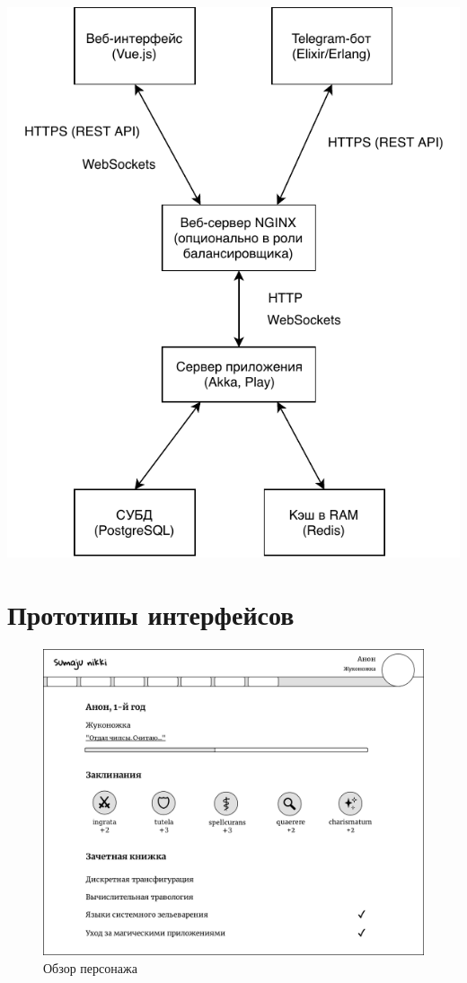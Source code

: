 \documentclass[12pt, a4paper]{article}
\begin{document}
\begin{center}
\includegraphics{architecture-overview.pdf}
\end{center}

\section{Прототипы интерфейсов}

\begin{figure}[H]
  \centering
  \includegraphics[width=15.6cm]{ui-mockup-character.png}
  \caption{Обзор персонажа}
\end{figure}
\end{document}
